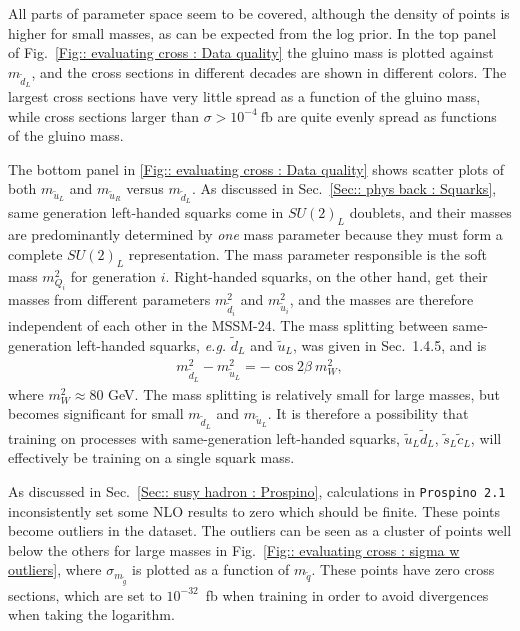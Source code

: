 \documentclass[twoside,english]{uiofysmaster}
\begin{document}
{{All parts of parameter space seem to be covered, although the density of points is higher for small masses, as can be expected from the log prior. In the top panel of Fig.~\ref{Fig:: evaluating cross : Data quality} the gluino mass is plotted against $m_{\widetilde{d}_L}$, and the cross sections in different decades are shown in different colors. The largest cross sections have very little spread as a function of the gluino mass, while cross sections larger than $\sigma > 10^{-4}~\mathrm{fb}$ are quite evenly spread as functions of the gluino mass.


The bottom panel in \autoref{Fig:: evaluating cross : Data quality} shows scatter plots of both $m_{\widetilde{u}_L}$ and $m_{\widetilde{u}_R}$ versus $m_{\widetilde{d}_L}$. As discussed in Sec.~\ref{Sec:: phys back : Squarks}, same generation left-handed squarks come in $SU(2)_L$ doublets, and their masses are predominantly determined by \textit{one} mass parameter because they must form a complete $SU(2)_L$ representation. The mass parameter responsible is the soft mass $m_{Q_i}^2$ for generation $i$.  Right-handed squarks, on the other hand, get their masses from different parameters $m_{\widetilde{d}_i}^2$ and $m_{\widetilde{u}_i}^2$, and the masses are therefore independent of each other in the MSSM-24. The mass splitting between same-generation left-handed squarks, \textit{e.g.} $\widetilde{d}_L$ and $\widetilde{u}_L$, was given in Sec.~1.4.5, and is
\begin{align*}
m_{\widetilde{d}_L}^2 - m_{\widetilde{u}_L}^2 = - \cos 2 \beta ~m_W^2,
\end{align*}
where $m_W^2 \approx 80$ GeV. The mass splitting is relatively small for large masses, but becomes significant for small $m_{\widetilde{d}_L}$ and $m_{\widetilde{u}_L}$. It is therefore a possibility that training on processes with same-generation left-handed squarks, $\widetilde{u}_L \widetilde{d}_L$, $\widetilde{s}_L \widetilde{c}_L$, will effectively be training on a single squark mass. 


As discussed in Sec.~\ref{Sec:: susy hadron : Prospino}, calculations in \verb|Prospino 2.1| inconsistently set some NLO results to zero which should be finite. These points become outliers in the dataset. The outliers can be seen as a cluster of points well below the others for large masses in Fig.~\ref{Fig:: evaluating cross : sigma w outliers}, where $\sigma_{m_{\widetilde{g}}}$ is plotted as a function of $m_{\widetilde{q}}$. These points have zero cross sections, which are set to $10^{-32}$~fb when training in order to avoid divergences when taking the logarithm. 

}}
\end{document}
